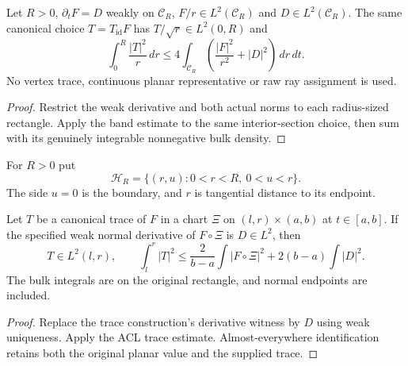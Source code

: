 \begin{lemma}
\label{lem:canonical-weighted-cone-trace}
\leanok
Let $R>0$, $\partial_tF=D$ weakly on $\mathcal C_R$,
$F/r\in L^2(\mathcal C_R)$ and $D\in L^2(\mathcal C_R)$.
The same canonical choice $T=T_{\mathrm{id}}F$ has
$T/\sqrt r\in L^2(0,R)$ and
\[
 \int_0^R\frac{|T|^2}{r}\,dr
 \le4\int_{\mathcal C_R}\left(\frac{|F|^2}{r^2}+|D|^2\right)\,dr\,dt.
\]
No vertex trace, continuous planar representative or raw ray assignment is used.
\end{lemma}

\begin{proof}
\leanok
Restrict the weak derivative and both actual norms to each radius-sized
rectangle. Apply the band estimate to the same interior-section choice,
then sum with its genuinely integrable nonnegative bulk density.
\end{proof}

\begin{definition}
\label{def:cartesian-half-cone}
\leanok
For $R>0$ put
\[
 \mathcal H_R=\{(r,u):0<r<R,\ 0<u<r\}.
\]
The side $u=0$ is the boundary, and $r$ is tangential distance to its endpoint.
\end{definition}

\begin{lemma}
\label{lem:one-sided-trace-energy}
\leanok
Let $T$ be a canonical trace of $F$ in a chart $\Xi$ on
$(l,r)\times(a,b)$ at $t\in[a,b]$.
If the specified weak normal derivative of $F\circ\Xi$ is $D\in L^2$, then
\[
 T\in L^2(l,r),\qquad
 \int_l^r|T|^2
 \le \frac{2}{b-a}\int|F\circ\Xi|^2+2(b-a)\int|D|^2.
\]
The bulk integrals are on the original rectangle, and normal endpoints
are included.
\end{lemma}

\begin{proof}
\leanok
Replace the trace construction's derivative witness by $D$ using weak uniqueness.
Apply the ACL trace estimate. Almost-everywhere identification retains both
the original planar value and the supplied trace.
\end{proof}

